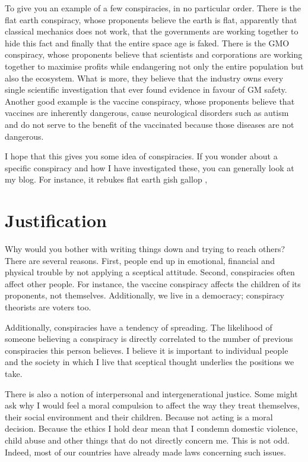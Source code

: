 \begin{multicols}{2}
To give you an example of a few conspiracies, in no particular order. There is the flat earth conspiracy, whose proponents believe the earth is flat,
apparently that classical mechanics does not work, that the governments are working together to hide this fact and finally that the entire space age
is faked. There is the GMO conspiracy, whose proponents believe that scientists and corporations are working together to maximise profits while endangering
not only the entire population but also the ecosystem. What is more, they believe that the industry owns every single scientific investigation that
ever found evidence in favour of GM safety. Another good example is the vaccine conspiracy, whose proponents believe that vaccines are inherently dangerous,
cause neurological disorders such as autism and do not serve to the benefit of the vaccinated because those diseases are not dangerous.


I hope that this gives you some idea of conspiracies. If you wonder about a specific conspiracy and how I have investigated these, you can generally
look at my blog. For instance, it rebukes flat earth gish gallop \cite{blogfe},


\section{Justification}

Why would you bother with writing things down and trying to reach others? There are several reasons. First, people end up in emotional, financial
and physical trouble by not applying a sceptical attitude. Second, conspiracies often affect other people. For instance, the vaccine conspiracy
affects the children of its proponents, not themselves. Additionally, we live in a democracy; conspiracy theorists are voters too.


Additionally, conspiracies have a tendency of spreading. The likelihood of someone believing a conspiracy is directly correlated to the number of
previous conspiracies this person believes. I believe it is important to individual people and the society in which I live that sceptical thought
underlies the positions we take. 
	

There is also a notion of interpersonal and intergenerational justice. Some might ask why I would feel a moral compulsion to affect the way
they treat themselves, their social environment and their children. Because not acting is a moral decision. Because the ethics I hold dear 
mean that I condemn domestic violence, child abuse and other things that do not directly concern me. This is not odd. Indeed, most of our
countries have already made laws concerning such issues. 



\end{multicols}
